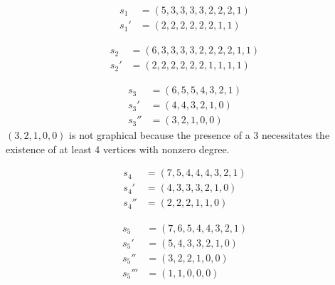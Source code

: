 \documentclass[12pt]{article}
\begin{document}
\newpage{}

\begin{align*}
    s_1  &= (5,3,3,3,3,2,2,2,1) \\
    s_1' &=   (2,2,2,2,2,2,1,1)
\end{align*}

\begin{align*}
    s_2  &= (6,3,3,3,3,2,2,2,2,1,1) \\
    s_2' &=   (2,2,2,2,2,2,1,1,1,1)
\end{align*}

\begin{align*}
    s_3    &= (6,5,5,4,3,2,1) \\
    s_3'   &=   (4,4,3,2,1,0) \\
    s_3''  &=     (3,2,1,0,0)
\end{align*}
$(3,2,1,0,0)$ is not graphical because the presence of a 3 necessitates the existence of at least 4 vertices with nonzero degree.

\begin{align*}
    s_4   &= (7,5,4,4,4,3,2,1) \\
    s_4'  &=   (4,3,3,3,2,1,0) \\
    s_4'' &=     (2,2,2,1,1,0) %
\end{align*}

\begin{align*}
    s_5    &= (7,6,5,4,4,3,2,1) \\
    s_5'   &=   (5,4,3,3,2,1,0) \\
    s_5''  &=     (3,2,2,1,0,0) \\
    s_5''' &=       (1,1,0,0,0) %
\end{align*}
\end{document}
